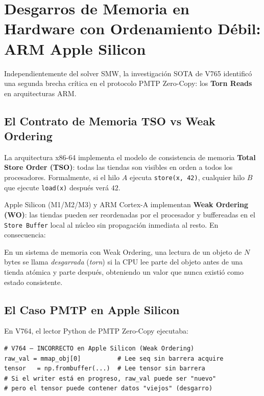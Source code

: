 \section{Desgarros de Memoria en Hardware con Ordenamiento Débil: ARM Apple Silicon}

Independientemente del solver SMW, la investigación SOTA de V765 identificó una segunda
brecha crítica en el protocolo PMTP Zero-Copy: los \textbf{Torn Reads} en arquitecturas ARM.

\subsection{El Contrato de Memoria TSO vs Weak Ordering}

La arquitectura x86-64 implementa el modelo de consistencia de memoria
\textbf{Total Store Order (TSO)}: todas las tiendas son visibles en orden a todos los procesadores.
Formalmente, si el hilo $A$ ejecuta \texttt{store(x, 42)}, cualquier hilo $B$ que
ejecute \texttt{load(x)} después verá $42$.

Apple Silicon (M1/M2/M3) y ARM Cortex-A implementan \textbf{Weak Ordering (WO)}:
las tiendas pueden ser reordenadas por el procesador y buffereadas en el \texttt{Store Buffer}
local al núcleo sin propagación inmediata al resto. En consecuencia:

\begin{definition}
En un sistema de memoria con Weak Ordering, una lectura de un objeto de $N$ bytes se
llama \emph{desgarrada} (\textit{torn}) si la CPU lee parte del objeto antes de una tienda
atómica y parte después, obteniendo un valor que nunca existió como estado consistente.
\end{definition}

\subsection{El Caso PMTP en Apple Silicon}

En V764, el lector Python de PMTP Zero-Copy ejecutaba:
\begin{lstlisting}[style=pythonstyle, caption={Lectura directa: susceptible a Torn Read en ARM}]
# V764 — INCORRECTO en Apple Silicon (Weak Ordering)
raw_val = mmap_obj[0]          # Lee seq sin barrera acquire
tensor   = np.frombuffer(...)  # Lee tensor sin barrera
# Si el writer está en progreso, raw_val puede ser "nuevo"
# pero el tensor puede contener datos "viejos" (desgarro)
\end{lstlisting}

